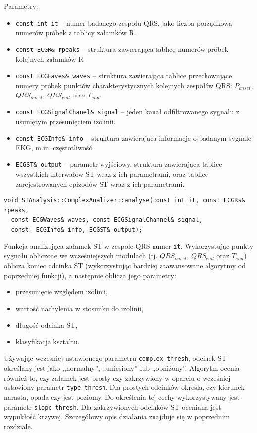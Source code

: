 \documentclass[a4paper, 11pt]{article}
\begin{document}
Parametry:
\begin{itemize}
  \item \verb|const int it| -- numer badanego zespołu QRS, jako liczba
    porządkowa numerów próbek z tablicy załamków R.
  \item \verb|const ECGR& rpeaks| -- struktura zawierająca tablicę numerów
    próbek kolejnych załamków R
  \item \verb|const ECGEaves& waves| -- struktura zawierająca tablice
    przechowujące numery próbek punktów charakterystycznych kolejnych zespołów
    QRS: $P_{onset}$, $QRS_{onset}$, $QRS_{end}$ oraz $T_{end}$.
  \item \verb|const ECGSignalChanel& signal| -- jeden kanał odfiltrowanego
    sygnału z usuniętym przesunięciem izolinii.
  \item \verb|const ECGInfo& info| -- struktura zawierająca informacje o badanym
    sygnale EKG, m.in. częstotliwość.
  \item \verb|ECGST& output| -- parametr wyjściowy, struktura zawierająca
    tablice wszystkich interwałów ST wraz z ich parametrami, oraz tablice
    zarejestrowanych epizodów ST wraz z ich parametrami.
\end{itemize}

\begin{lstlisting}
void STAnalysis::ComplexAnalizer::analyse(const int it, const ECGRs& rpeaks,
  const ECGWaves& waves, const ECGSignalChannel& signal,
  const  ECGInfo& info, ECGST& output);
\end{lstlisting}

Funkcja analizująca załamek ST w zespole QRS numer \verb|it|. Wykorzystując
punkty sygnału obliczone we wcześniejszych modułach (tj. $QRS_{onset}$,
$QRS_{end}$ oraz $T_{end}$) oblicza koniec odcinka ST (wykorzystując bardziej
zaawansowane algorytmy od poprzedniej funkcji), a następnie oblicza jego parametry:
\begin{itemize}
  \item przesunięcie względem izolinii,
  \item wartość nachylenia w stosunku do izolinii,
  \item długość odcinka ST,
  \item klasyfikacja kształtu.
\end{itemize}
Używając wcześniej ustawionego parametru \verb|complex_thresh|, odcinek ST
określany jest jako ,,normalny'', ,,uniesiony'' lub ,,obniżony''. Algorytm
ocenia również to, czy załamek jest prosty czy zakrzywiony w oparciu o
wcześniej ustawiony parametr \verb|type_thresh|. Dla prostych odcinków określa,
czy kierunek narasta, opada czy jest poziomy. Do określenia tej cechy
wykorzystywany jest parametr \verb|slope_thresh|. Dla zakrzywionych odcinków ST
oceniana jest wypukłość krzywej. Szczegółowy opis działania znajduje się w
poprzednim rozdziale.
\end{document}
